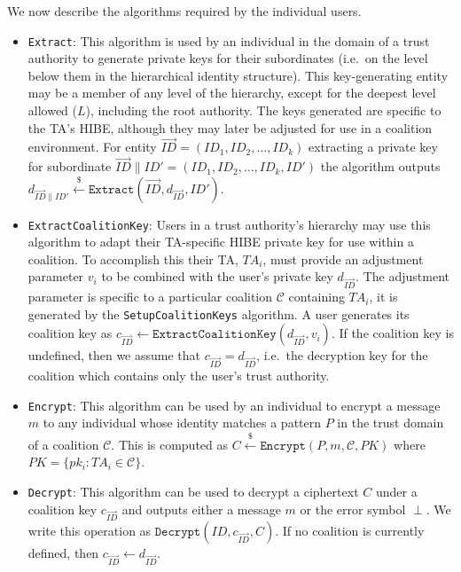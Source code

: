 \documentclass{IEEEtran}
\newcommand{\C}{\mathcal{C}}
\newcommand{\ID}{\mathit{ID}}
\newcommand{\TA}{\mathit{TA}}
\newcommand{\getsr}{\stackrel{{\scriptscriptstyle\$}}{\gets}}
\begin{document}

We now describe the algorithms required by the individual users.

\begin{itemize}
\item \texttt{Extract}: This algorithm is used by an individual in
the domain of a trust authority to generate private keys for
their subordinates (i.e.\ on the level below them in the
hierarchical identity structure). This key-generating entity may
be a member of any level of the hierarchy, except for the
deepest level allowed ($L$), including the root authority. The
keys generated are specific to the TA's HIBE, although they may
later be adjusted for use in a coalition environment. For entity
$\vec{\ID} = (\ID_1, \ID_2,
\ldots,
\ID_k)$ extracting a private key for subordinate
$\vec{\ID}\|\ID' = (\ID_1, \ID_2,
\ldots,
\ID_k, \ID')$ the algorithm outputs $d_{\vec{\ID}\|\ID'} \getsr
\texttt{Extract}(\vec{\ID},d_{\vec{\ID}}, \ID')$.
\medskip

\item \texttt{ExtractCoalitionKey}: Users in a trust authority's
hierarchy may use this algorithm to adapt their TA-specific HIBE
private key for use within a coalition. To accomplish this their
TA, $\TA_i$, must provide an adjustment parameter $v_i$ to be
combined with the user's private key $d_{\vec{\ID}}$. The
adjustment parameter is specific to a particular coalition $\C$
containing $\TA_i$, it is generated by the
\texttt{SetupCoalitionKeys} algorithm. A user generates its
coalition key as $c_{\vec{\ID}}\gets
\texttt{ExtractCoalitionKey}(d_{\vec{\ID}}, v_i)$. If the coalition
key is undefined, then we assume that $c_{\vec{\ID}} =
d_{\vec{\ID}}$, i.e.\ the decryption key for the coalition which
contains only the user's trust authority.
\medskip

\item \texttt{Encrypt}: This algorithm can be used by an individual
to encrypt a message $m$ to any individual whose identity
matches a pattern $P$ in the trust domain of a coalition $\C$.
This is computed as $C \getsr \texttt{Encrypt}(P,m,\C,PK)$ where
$PK = \{pk_i : \TA_i \in \C\}$.
\medskip

\item \texttt{Decrypt}: This algorithm can be used to decrypt a
ciphertext $C$ under a coalition key $c_{\vec{\ID}}$ and outputs
either a message $m$ or the error symbol $\perp$. We write this
operation as $\texttt{Decrypt}(\ID,c_{\vec{\ID}},C)$. If no
coalition is currently defined, then $c_{\vec{\ID}} \gets
d_{\vec{\ID}}$.\medskip
\end{itemize}
\end{document}
